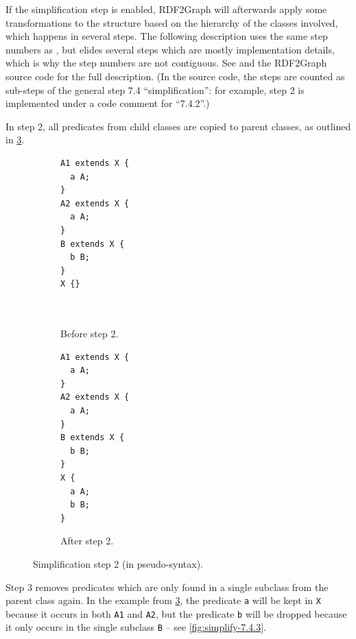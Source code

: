 If the simplification step is enabled,
\gls{RDF2Graph} will afterwards apply some transformations to the structure
based on the hierarchy of the classes involved,
which happens in several steps.
The following description uses the same step numbers as \cite{vanDam2015},
but elides several steps which are mostly implementation details,
which is why the step numbers are not contiguous.
See \cite{vanDam2015} and the \gls{RDF2Graph} source code for the full description.
(In the source code, the steps are counted as sub-steps of the general step 7.4 “simplification”:
for example, step 2 is implemented under a code comment for “7.4.2”.)


In step 2, all \glspl{predicate} from child classes are copied to parent classes,
as outlined in \cref{fig:simplify-7.4.2}.

\begin{figure}[ht]
  \begin{subfigure}[t]{0.45\textwidth}
    \begin{lstlisting}[showlines=true]
A1 extends X {
  a A;
}
A2 extends X {
  a A;
}
B extends X {
  b B;
}
X {}



    \end{lstlisting}
    \caption{Before step 2.}
    \label{fig:simplify-7.4.2-before}
  \end{subfigure}
  \begin{subfigure}[t]{0.45\textwidth}
    \begin{lstlisting}
A1 extends X {
  a A;
}
A2 extends X {
  a A;
}
B extends X {
  b B;
}
X {
  a A;
  b B;
}
    \end{lstlisting}
    \caption{After step 2.}
    \label{fig:simplify-7.4.2-after}
  \end{subfigure}
  \caption[Simplification step 2.]{Simplification step 2 (in pseudo-syntax).}
  \label{fig:simplify-7.4.2}
\end{figure}

Step 3  removes \glspl{predicate} which are only found in a single subclass
from the parent class again.
In the example from \cref{fig:simplify-7.4.2},
the \gls{predicate} \lstinline{a} will be kept in \lstinline{X}
because it occurs in both \lstinline{A1} and \lstinline{A2},
but the \gls{predicate} \lstinline{b} will be dropped
because it only occurs in the single subclass \lstinline{B} –
see \cref{fig:simplify-7.4.3}.

